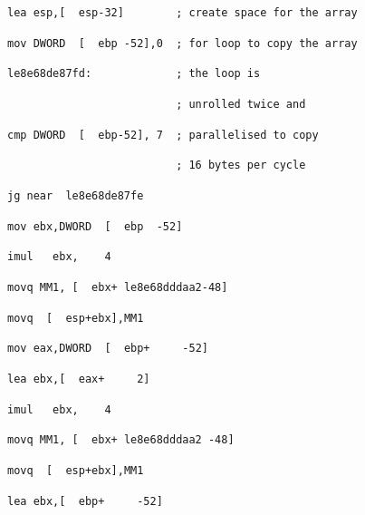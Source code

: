 {\begin{lyxcode}
~\texttt{\footnotesize lea~esp,{[}~~esp-32{]}~~~~~~~~;~create~space~for~the~array}{\footnotesize \par}

~\texttt{\footnotesize mov~DWORD~~{[}~~ebp~-52{]},0~~;~for~loop~to~copy~the~array}{\footnotesize \par}

~\texttt{\footnotesize le8e68de87fd:~~~~~~~~~~~~~;~the~loop~is~}{\footnotesize \par}

~\texttt{\footnotesize ~~~~~~~~~~~~~~~~~~~~~~~~~~;~unrolled~twice~and}{\footnotesize \par}

~\texttt{\footnotesize cmp~DWORD~~{[}~~ebp-52{]},~7~~;~parallelised~to~copy~}{\footnotesize \par}

~\texttt{\footnotesize ~~~~~~~~~~~~~~~~~~~~~~~~~~;~16~bytes~per~cycle}{\footnotesize \par}

~\texttt{\footnotesize jg~near~~le8e68de87fe}{\footnotesize \par}

~\texttt{\footnotesize mov~ebx,DWORD~~{[}~~ebp~~-52{]}}{\footnotesize \par}

~\texttt{\footnotesize imul~~~ebx,~~~~4}{\footnotesize \par}

~\texttt{\footnotesize movq~MM1,~{[}~~ebx+~le8e68dddaa2-48{]}}{\footnotesize \par}

~\texttt{\footnotesize movq~~{[}~~esp+ebx{]},MM1}{\footnotesize \par}

~\texttt{\footnotesize mov~eax,DWORD~~{[}~~ebp+~~~~~-52{]}}{\footnotesize \par}

~\texttt{\footnotesize lea~ebx,{[}~~eax+~~~~~2{]}}{\footnotesize \par}

~\texttt{\footnotesize imul~~~ebx,~~~~4}{\footnotesize \par}

~\texttt{\footnotesize movq~MM1,~{[}~~ebx+~le8e68dddaa2~-48{]}}{\footnotesize \par}

~\texttt{\footnotesize movq~~{[}~~esp+ebx{]},MM1}{\footnotesize \par}

~\texttt{\footnotesize lea~ebx,{[}~~ebp+~~~~~-52{]}}{\footnotesize \par}


\end{lyxcode}}

